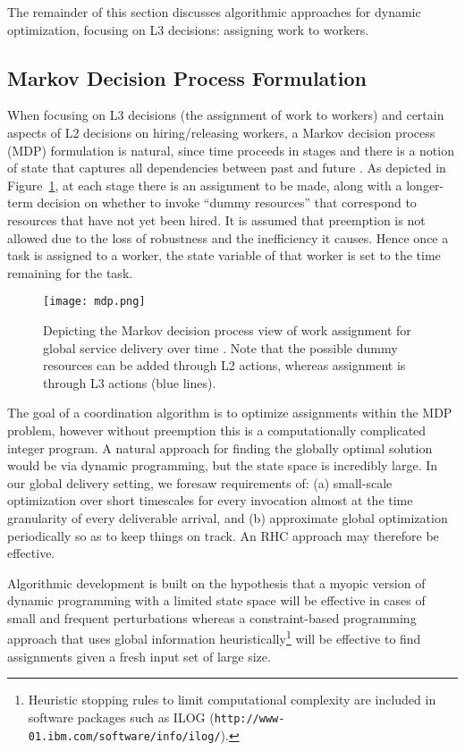 \documentclass[10pt,journal,cspaper,compsoc]{IEEEtran}
\begin{document}
The remainder of this section discusses algorithmic approaches for dynamic optimization,
focusing on L3 decisions: assigning work to workers.

\subsection{Markov Decision Process Formulation}
When focusing on L3 decisions (the assignment of work to workers) and certain aspects of 
L2 decisions on hiring/releasing workers, a Markov decision process (MDP) formulation is natural,
since time proceeds in stages and there is a notion of state that captures all dependencies
between past and future \cite{Howard1960}.  As depicted in Figure~\ref{fig:mdp}, at each stage
there is an assignment to be made, along with a longer-term decision on whether to invoke
``dummy resources'' that correspond to resources that have not yet been hired.  It is assumed
that preemption is not allowed due to the loss of robustness and the inefficiency \cite{OppenheimVC2014}
it causes.  Hence once a task is assigned to a worker, the state variable of that worker is set
to the time remaining for the task.

\begin{figure}
  \centering
  \texttt{[image: mdp.png]}
  \caption{Depicting the Markov decision process view of work assignment for global service delivery over time .  Note that 
	the possible dummy resources can be added through L2 actions, whereas assignment is through L3 actions (blue lines).}
  \label{fig:mdp}
\end{figure}

The goal of a coordination algorithm is to optimize assignments within the MDP problem, however without preemption this
is a computationally complicated integer program.  A natural approach for finding the globally optimal solution would
be via dynamic programming, but the state space is incredibly large.  In our global delivery setting, we foresaw 
requirements of: (a) small-scale optimization over short timescales for every invocation almost at the time granularity 
of every deliverable arrival, and (b) approximate global optimization periodically so as to keep things on track.
An RHC approach may therefore be effective.

Algorithmic development is built on the hypothesis that a myopic version of dynamic programming with a 
limited state space will be effective in cases of small and frequent perturbations whereas a constraint-based programming
approach that uses global information heuristically\footnote{Heuristic stopping rules to limit computational complexity
are included in software packages such as ILOG ({\tt http://www-01.ibm.com/software/info/ilog/}).} will be effective 
to find assignments given a fresh input set of large size.
\end{document}
